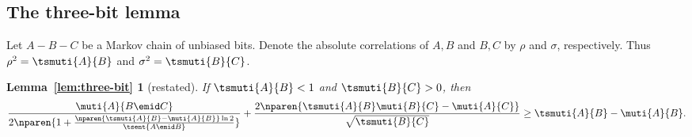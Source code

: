 \subsection{The three-bit lemma}
\label{sec:3bit}
Let $A-B-C$ be a Markov chain of unbiased bits. Denote the absolute
correlations of $A,B$ and $B,C$ by $\rho$ and $\sigma$, respectively.
Thus $\rho^2=\tsmuti{A}{B}$ and $\sigma^2=\tsmuti{B}{C}$.


\begingroup
\newtheorem*{restatedthreebitlemma}{Lemma~\ref{lem:three-bit}}
\begin{restatedthreebitlemma}[restated]
If $\tsmuti{A}{B}<1$ and $\tsmuti{B}{C}>0$, then
\begin{equation*}
  \frac{\muti{A}{B\emid C}}
  {2\nparen{1+
    \frac{\nparen{\tsmuti{A}{B}-\muti{A}{B}}\ln2}{\tsent{A\emid B}}}}
  +\frac{2\nparen{\tsmuti{A}{B}\muti{B}{C}-\muti{A}{C}}}
  {\sqrt{\tsmuti{B}{C}}}
  \ge\tsmuti{A}{B}-\muti{A}{B}.
\end{equation*}
\end{restatedthreebitlemma}
\endgroup
